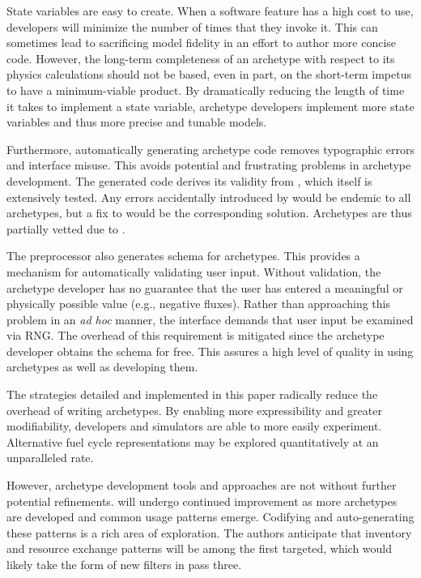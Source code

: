 State variables are easy to create. When a software feature has a high cost to use,
developers will minimize the number of times that they invoke it. This can 
sometimes lead to sacrificing model fidelity in an effort to author more concise
code. However, the long-term completeness of an archetype
with respect to its physics calculations should not be based, even in part, on the
short-term impetus to have a minimum-viable product. By dramatically reducing the 
length of time it takes to implement a state variable, archetype developers implement
more state variables and thus more precise and tunable models.

Furthermore, automatically generating archetype code removes typographic errors and 
\cyclus interface misuse. This avoids potential and frustrating problems in 
archetype development. The 
generated code derives its validity from \cycpp, which itself is extensively 
tested. Any errors accidentally introduced by \cycpp would be endemic to all archetypes, 
but a fix to \cycpp would be the corresponding solution. Archetypes are thus 
partially vetted due to \cycpp.

The preprocessor also generates schema for archetypes. This provides a mechanism 
for automatically validating user input.  Without validation, the archetype 
developer has no guarantee that the user has entered a meaningful or physically possible 
value (e.g., negative fluxes). Rather than approaching this problem in an
\emph{ad hoc} 
manner, the \cyclus interface demands that user input be examined via \gls{RNG}.  The overhead 
of this requirement is mitigated since the archetype developer obtains the schema
for free. This assures a high level of quality in using archetypes as well as 
developing them.

The strategies detailed and implemented in this paper radically
reduce the overhead of writing archetypes. By enabling more expressibility and greater
modifiability, developers and simulators are able to more easily experiment.  
Alternative fuel cycle representations may be explored quantitatively at an
unparalleled rate.

However, archetype development tools and approaches are not without further 
potential refinements. \cycpp will undergo continued improvement 
as more archetypes are developed and common usage patterns emerge. Codifying and 
auto-generating these patterns is a rich area of exploration. The authors anticipate 
that inventory and resource exchange patterns will be among the first
targeted, 
which would likely take the form of new filters in pass three.

